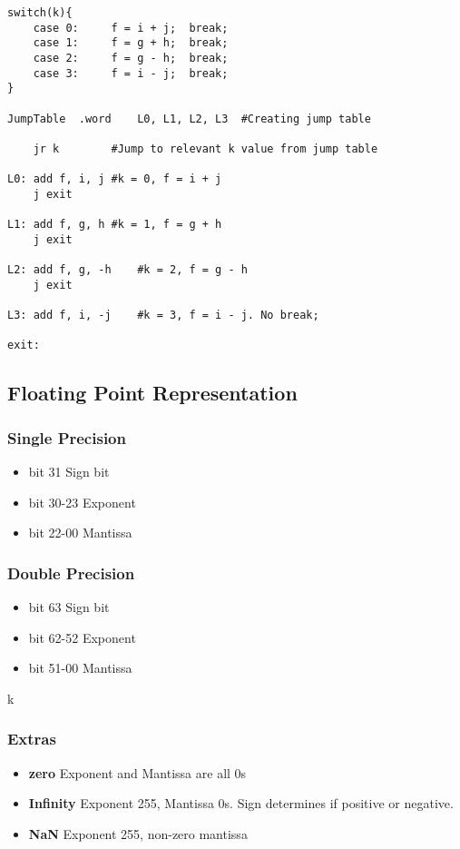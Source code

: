 \documentclass{article}
\newcommand\tab[1][0.5cm]{\hspace*{#1}}
\begin{document}
		\begin{lstlisting}
switch(k){
	case 0:		f = i + j;	break;
	case 1:		f = g + h;	break;
	case 2:		f = g - h;	break;
	case 3:		f = i - j;	break;
}

JumpTable  .word	L0, L1, L2, L3	#Creating jump table

	jr k		#Jump to relevant k value from jump table

L0:	add f, i, j	#k = 0, f = i + j
	j exit

L1:	add f, g, h	#k = 1, f = g + h
	j exit

L2:	add f, g, -h	#k = 2, f = g - h
	j exit

L3: add f, i, -j	#k = 3, f = i - j. No break;

exit:
		\end{lstlisting}

	\subsection*{Floating Point Representation}
		\subsubsection*{Single Precision}
		\begin{itemize}
			\item bit 31 \tab \tab Sign bit
			\item bit 30-23 \tab Exponent
			\item bit 22-00 \tab Mantissa
		\end{itemize}

		\subsubsection*{Double Precision}
		\begin{itemize}
			\item bit 63 \tab \tab Sign bit
			\item bit 62-52 \tab Exponent
			\item bit 51-00 \tab Mantissa
		\end{itemize}
		k
		\subsubsection*{Extras}
		\begin{itemize}
			\item \textbf{zero} \tab \tab Exponent and Mantissa are all 0s
			\item \textbf{Infinity} \tab Exponent 255, Mantissa 0s. Sign determines if positive or negative.
			\item \textbf{NaN} \tab \tab Exponent 255, non-zero mantissa
		\end{itemize}
\end{document}
